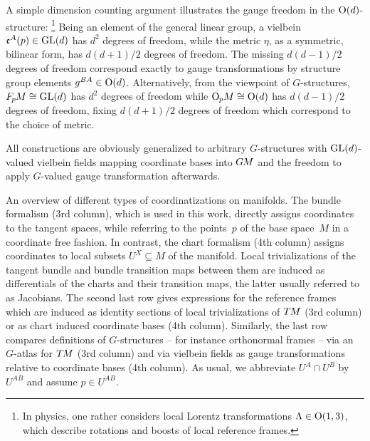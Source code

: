 A simple dimension counting argument illustrates the gauge freedom in the $\operatorname{O}(d)$-structure:%
\footnote{
    In physics, one rather considers local Lorentz transformations $\Lambda \in \operatorname{O}(1,3)$, which describe rotations and boosts of local reference frames.
}
Being an element of the general linear group, a vielbein $\mathfrak{e}^A(p) \in \operatorname{GL}(d)$ has $d^2$ degrees of freedom, while the metric $\eta$, as a symmetric, bilinear form, has $d(d+1)/2$ degrees of freedom.
The missing $d(d-1)/2$ degrees of freedom correspond exactly to gauge transformations by structure group elements $g^{BA} \in \operatorname{O}(d)$.
Alternatively, from the viewpoint of $G$-structures, $F_{\mkern-1.5mu p}\mkern-1.0muM \cong \operatorname{GL}(d)$ has $d^2$ degrees of freedom while $\operatorname{O}_{\mkern-1.1mu p}\mkern-3.4muM \cong \operatorname{O}(d)$ has $d(d-1)/2$ degrees of freedom, fixing $d(d+1)/2$ degrees of freedom which correspond to the choice of metric.


All constructions are obviously generalized to arbitrary $G$-structures with $\operatorname{GL}(d)$-valued vielbein fields mapping coordinate bases into $G\mkern-1.4muM$ and the freedom to apply $G$-valued gauge transformation afterwards.



\begin{landscape}
\begin{table}[h!]
    \vspace*{8ex}
    \centering%
    \scalebox{1.}{%
        
    }%
    \vspace*{4ex}%
    \captionsetup{width=.9\linewidth}
    \caption{
        An overview of different types of coordinatizations on manifolds.
        The bundle formalism (3rd column), which is used in this work, directly assigns coordinates to the tangent spaces, while referring to the points~$p$ of the base space~$M$ in a coordinate free fashion.
        In contrast, the chart formalism (4th column) assigns coordinates to local subsets $U^X \subseteq M$ of the manifold.
        Local trivializations of the tangent bundle and bundle transition maps between them are induced as differentials of the charts and their transition maps, the latter usually referred to as Jacobians.
        The second last row gives expressions for the reference frames which are induced as identity sections of local trivializations of $T\mkern-1.5muM$ (3rd column) or as chart induced coordinate bases (4th column).
        Similarly, the last row compares definitions of $G$-structures -- for instance orthonormal frames -- via an $G$-atlas for $T\mkern-1.5muM$ (3rd column) and via vielbein fields as gauge transformations relative to coordinate bases (4th column).
        As usual, we abbreviate $U^A \cap U^B$ by $U^{AB}$ and assume $p\in U^{AB}$.
    }
    \label{tab:coord_charts_gauge_trafos}
\end{table}
\end{landscape}
